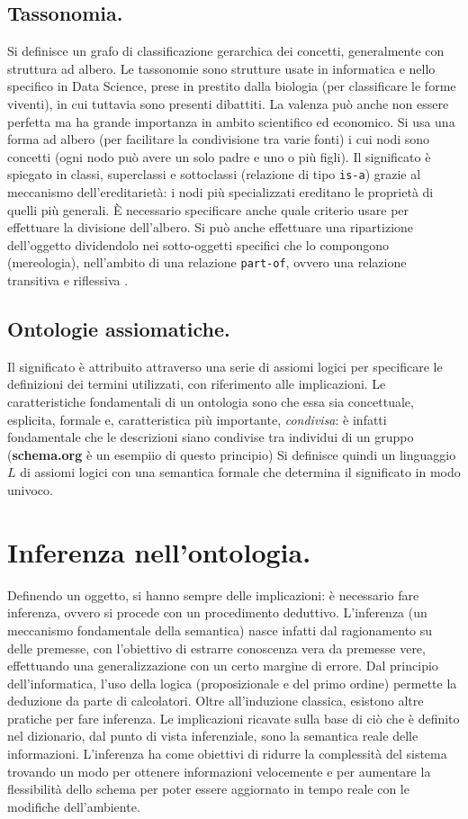 \documentclass[11pt]{article}
\begin{document}
\subsection{Tassonomia.}
Si definisce un grafo di classificazione gerarchica dei concetti, generalmente con struttura ad albero.
Le tassonomie sono strutture usate in informatica e nello specifico in Data Science, prese in prestito dalla biologia (per classificare le forme viventi), in cui tuttavia sono presenti dibattiti.
La valenza può anche non essere perfetta ma ha grande importanza in ambito scientifico ed economico.
Si usa una forma ad albero (per facilitare la condivisione tra varie fonti) i cui nodi sono concetti (ogni nodo può avere un solo padre e uno o più figli).
Il significato è spiegato in classi, superclassi e sottoclassi (relazione di tipo \verb|is-a|) grazie al meccanismo dell'ereditarietà: i nodi più specializzati ereditano le proprietà di quelli più generali.
È necessario specificare anche quale criterio usare per effettuare la divisione dell'albero.
Si può anche effettuare una ripartizione dell'oggetto dividendolo nei sotto-oggetti specifici che lo compongono (mereologia), nell'ambito di una relazione \verb|part-of|, ovvero una relazione transitiva e riflessiva .

\subsection{Ontologie assiomatiche.}
Il significato è attribuito attraverso una serie di assiomi logici per specificare le definizioni dei termini utilizzati, con riferimento alle implicazioni. Le caratteristiche fondamentali di un ontologia sono che essa sia concettuale, esplicita, formale e, caratteristica più importante, \textit{condivisa}: è infatti fondamentale che le descrizioni siano condivise tra individui di un gruppo (\textbf{schema.org} è un esempiio di questo principio)
Si definisce quindi un linguaggio $L$ di assiomi logici con una semantica formale che determina il significato in modo univoco.

\section{Inferenza nell'ontologia.}
Definendo un oggetto, si hanno sempre delle implicazioni: è necessario fare inferenza, ovvero si procede con un procedimento deduttivo. L'inferenza (un meccanismo fondamentale della semantica) nasce infatti dal ragionamento su delle premesse, con l'obiettivo di estrarre conoscenza vera da premesse vere, effettuando una generalizzazione con un certo margine di errore.
Dal principio dell'informatica, l'uso della logica (proposizionale e del primo ordine) permette la deduzione da parte di calcolatori.
Oltre all'induzione classica, esistono altre pratiche per fare inferenza.
Le implicazioni ricavate sulla base di ciò che è definito nel dizionario, dal punto di vista inferenziale, sono la semantica reale delle informazioni.
L'inferenza ha come obiettivi di ridurre la complessità del sistema trovando un modo per ottenere informazioni velocemente e per aumentare la flessibilità dello schema per poter essere aggiornato in tempo reale con le modifiche dell'ambiente.
\end{document}
